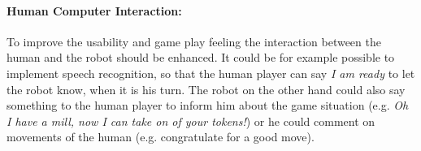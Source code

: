 \documentclass[a4paper]{spie}  %
\begin{document}
\begin{large}
\paragraph{Human Computer Interaction:} To improve the usability and game play feeling the interaction between the human and the robot should be enhanced. It could be for example possible to implement speech recognition, so that the human player can say \emph{I am ready} to let the robot know, when it is his turn. The robot on the other hand could also say something to the human player to inform him about the game situation (e.g. \emph{Oh I have a mill, now I can take on of your tokens!}) or he could comment on movements of the human (e.g. congratulate for a good move).
\newpage

%

\end{large}
\end{document}
